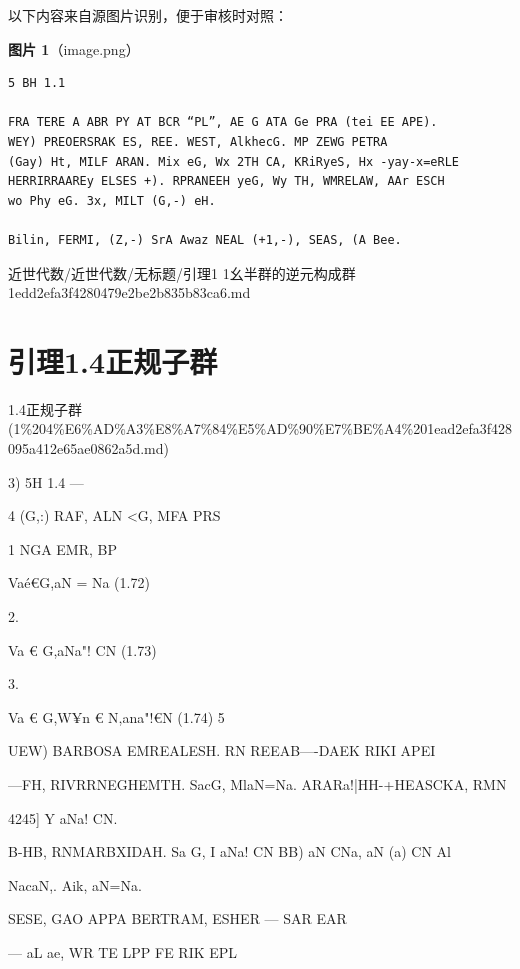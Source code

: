 \begin{note}
以下内容来自源图片识别，便于审核时对照：

\textbf{图片 1}（image.png）
\begin{Verbatim}[fontsize=\small]
5 BH 1.1

FRA TERE A ABR PY AT BCR “PL”, AE G ATA Ge PRA (tei EE APE).
WEY) PREOERSRAK ES, REE. WEST, AlkhecG. MP ZEWG PETRA
(Gay) Ht, MILF ARAN. Mix eG, Wx 2TH CA, KRiRyeS, Hx -yay-x=eRLE
HERRIRRAAREy ELSES +). RPRANEEH yeG, Wy TH, WMRELAW, AAr ESCH
wo Phy eG. 3x, MILT (G,-) eH.

Bilin, FERMI, (Z,-) SrA Awaz NEAL (+1,-), SEAS, (A Bee.
\end{Verbatim}

\end{note}

\begin{note}[来源路径]

近世代数/近世代数/无标题/引理1 1幺半群的逆元构成群 1edd2efa3f4280479e2be2b835b83ca6.md

\end{note}

\section*{引理1.4正规子群}

\begin{note}[来源上级主题]

1.4正规子群 (1\%204\%E6\%AD\%A3\%E8\%A7\%84\%E5\%AD\%90\%E7\%BE\%A4\%201ead2efa3f428095a412e65ae0862a5d.md)

\end{note}

\begin{lemma}[引理1.4正规子群]

3) 5H 1.4                                         —

4 (G,:) RAF, ALN <G, MFA PRS

1 NGA EMR, BP

Vaé€G,aN = Na                                       (1.72)

2.

Va € G,aNa"! CN                                    (1.73)

3.

Va € G,W¥n € N,ana"!€N                                   (1.74)  5

UEW) BARBOSA EMREALESH. RN REEAB—-DAEK RIKI APEI

—FH, RIVRRNEGHEMTH. SacG, MlaN=Na. ARARa!|HH-+HEASCKA, RMN

4245] Y aNa! CN.

B-HB, RNMARBXIDAH. Sa G, I aNa! CN BB) aN CNa, aN (a) CN Al

NacaN,. Aik, aN=Na.

SESE, GAO APPA BERTRAM, ESHER — SAR EAR

— aL ae, WR TE LPP FE RIK EPL

\end{lemma}


